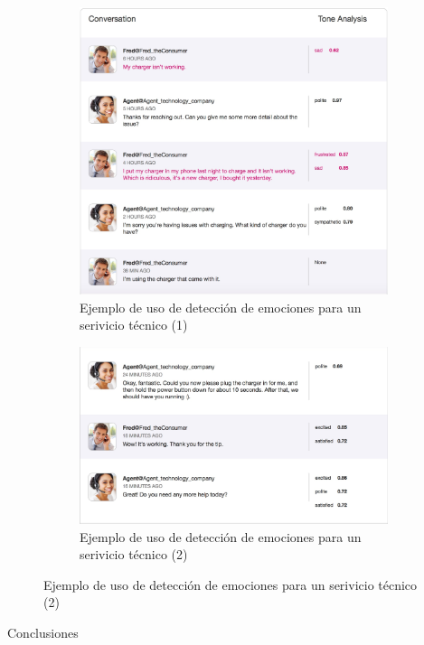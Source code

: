 \documentclass[compress]{beamer}
\begin{document}
\begin{frame}
	\begin{figure}[H]
		\centering
		\begin{subfigure}{.5\textwidth}
			\centering
			\label{conversacion1.jpg}
			\includegraphics[width=0.99\textwidth]{./Imagenes/conversacion1.jpeg}
			\caption{Ejemplo de uso de detección de emociones para un serivicio técnico (1)}
		\end{subfigure}%
		\begin{subfigure}{.5\textwidth}
			\centering
			\label{conversacion2.jpg}
			\includegraphics[width=0.99\textwidth]{./Imagenes/conversacion2.jpeg}
			\caption{Ejemplo de uso de detección de emociones para un serivicio técnico (2)}
		\end{subfigure}
	\end{figure}
\end{frame}

\begin{frame}{Conclusiones}
	
\end{frame}
\end{document}
